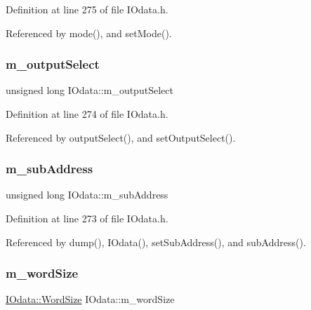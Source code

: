 Definition at line 275 of file I\+Odata.\+h.



Referenced by mode(), and set\+Mode().

\mbox{\label{classIOdata_acc46d71243b542e68277e242effa7f1b}} 
\subsubsection{\texorpdfstring{m\+\_\+output\+Select}{m\_outputSelect}}
{\footnotesize\ttfamily unsigned long I\+Odata\+::m\+\_\+output\+Select\hspace{0.3cm}{\ttfamily [private]}}



Definition at line 274 of file I\+Odata.\+h.



Referenced by output\+Select(), and set\+Output\+Select().

\mbox{\label{classIOdata_a562f84e5cace1e392f1b0fca553fff78}} 
\subsubsection{\texorpdfstring{m\+\_\+sub\+Address}{m\_subAddress}}
{\footnotesize\ttfamily unsigned long I\+Odata\+::m\+\_\+sub\+Address\hspace{0.3cm}{\ttfamily [private]}}



Definition at line 273 of file I\+Odata.\+h.



Referenced by dump(), I\+Odata(), set\+Sub\+Address(), and sub\+Address().

\mbox{\label{classIOdata_a719b0ce607ada4fa91b12d6ecfa1b4c9}} 
\subsubsection{\texorpdfstring{m\+\_\+word\+Size}{m\_wordSize}}
{\footnotesize\ttfamily \hyperlink{classIOdata_a37c53ebf4bf8d866aac8af572962a84c}{I\+Odata\+::\+Word\+Size} I\+Odata\+::m\+\_\+word\+Size\hspace{0.3cm}{\ttfamily [private]}}



